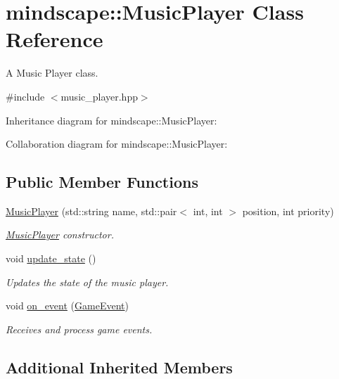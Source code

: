 \hypertarget{classmindscape_1_1_music_player}{}\section{mindscape\+:\+:Music\+Player Class Reference}
\label{classmindscape_1_1_music_player}


A Music Player class.  




{\ttfamily \#include $<$music\+\_\+player.\+hpp$>$}



Inheritance diagram for mindscape\+:\+:Music\+Player\+:


Collaboration diagram for mindscape\+:\+:Music\+Player\+:
\subsection*{Public Member Functions}
\begin{DoxyCompactItemize}
\item 
\hyperlink{classmindscape_1_1_music_player_a98268fcd0769466ccabef1b386be9cac}{Music\+Player} (std\+::string name, std\+::pair$<$ int, int $>$ position, int priority)
\begin{DoxyCompactList}\small\item\em \hyperlink{classmindscape_1_1_music_player}{Music\+Player} constructor. \end{DoxyCompactList}\item 
void \hyperlink{classmindscape_1_1_music_player_a21aa157610534ba64c9f87f7836cb9d9}{update\+\_\+state} ()
\begin{DoxyCompactList}\small\item\em Updates the state of the music player. \end{DoxyCompactList}\item 
void \hyperlink{classmindscape_1_1_music_player_a865555fc70044d188a23ec2e9da94037}{on\+\_\+event} (\hyperlink{class_game_event}{Game\+Event})
\begin{DoxyCompactList}\small\item\em Receives and process game events. \end{DoxyCompactList}\end{DoxyCompactItemize}
\subsection*{Additional Inherited Members}


